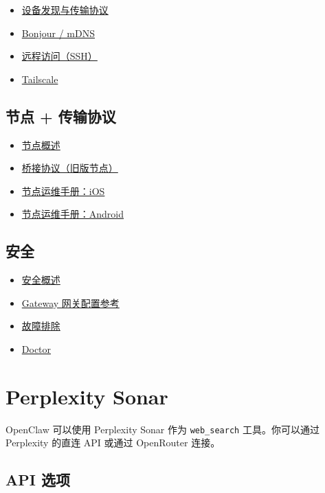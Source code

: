 \begin{itemize}
  \item \href{/gateway/discovery}{设备发现与传输协议}
  \item \href{/gateway/bonjour}{Bonjour / mDNS}
  \item \href{/gateway/remote}{远程访问（SSH）}
  \item \href{/gateway/tailscale}{Tailscale}
\end{itemize}


\subsection{节点 + 传输协议}


\begin{itemize}
  \item \href{/nodes}{节点概述}
  \item \href{/gateway/bridge-protocol}{桥接协议（旧版节点）}
  \item \href{/platforms/ios}{节点运维手册：iOS}
  \item \href{/platforms/android}{节点运维手册：Android}
\end{itemize}


\subsection{安全}


\begin{itemize}
  \item \href{/gateway/security}{安全概述}
  \item \href{/gateway/configuration}{Gateway 网关配置参考}
  \item \href{/gateway/troubleshooting}{故障排除}
  \item \href{/gateway/doctor}{Doctor}
\end{itemize}



\clearpage

\section{Perplexity Sonar}


OpenClaw 可以使用 Perplexity Sonar 作为 \texttt{web\_search} 工具。你可以通过 Perplexity 的直连 API 或通过 OpenRouter 连接。

\subsection{API 选项}


